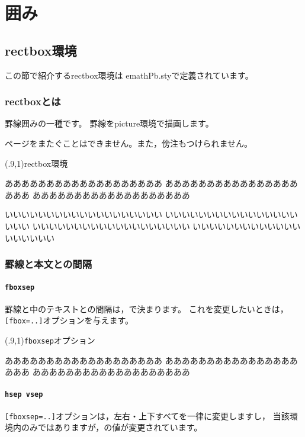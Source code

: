 \section{囲み}
\subsection{\textsf{rectbox}環境}
この節で紹介する\textsf{rectbox}環境は
\textsf{emathPb.sty}で定義されています。

\subsubsection{\textsf{rectbox}とは}
罫線囲みの一種です。
罫線を\textsf{picture}環境で描画します。

ページをまたぐことはできません。また，傍注もつけられません。

\begin{showEx}(.9,1){\textsf{rectbox}環境}
\begin{rectbox}
あああああああああああああああああああ
あああああああああああああああああああ
あああああああああああああああああああ

いいいいいいいいいいいいいいいいいいい
いいいいいいいいいいいいいいいいいいい
いいいいいいいいいいいいいいいいいいい
いいいいいいいいいいいいいいいいいいい
\end{rectbox}
\end{showEx}

\subsubsection{罫線と本文との間隔}
\paragraph{\texttt{fboxsep}}
罫線と中のテキストとの間隔は，で決まります。
これを変更したいときは，\verb+[fbox=..]+オプションを与えます。

\begin{showEx}(.9,1){\texttt{fboxsep}オプション}
\begin{rectbox}[fboxsep=1zw]
あああああああああああああああああああ
あああああああああああああああああああ
あああああああああああああああああああ
\end{rectbox}
\end{showEx}

\paragraph{\texttt{hsep vsep}}
\verb+[fboxsep=..]+オプションは，左右・上下すべてを一律に変更しますし，
当該環境内のみではありますが，の値が変更されています。

